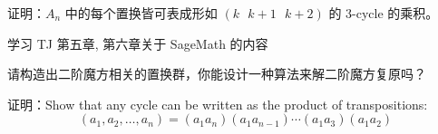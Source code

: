 \documentclass[a4paper, justified]{tufte-handout}
\begin{document}
\beginoptional

\begin{problem}[$Z_p$]
证明：$A_n$ 中的每个置换皆可表成形如 $(k \text{ } k+1 \text{ } k+2)$ 的 3-cycle 的乘积。
\end{problem}

\begin{solution}
\end{solution}

\begin{problem}[SageMath学习]
学习 TJ 第五章, 第六章关于 SageMath 的内容
\end{problem}

\begin{solution}
\end{solution}

\beginot
\begin{ot}[二阶魔方]	
	请构造出二阶魔方相关的置换群，你能设计一种算法来解二阶魔方复原吗？
\end{ot}


\begin{ot}[transpositions]	
	证明：Show that any cycle can be written as the product of transpositions:
	$$(a_1,a_2,…,a_n)=(a_1 a_n)(a_1 a_{n−1} )⋯(a_1 a_3)(a_1 a_2)$$
	
\end{ot}




% 




\beginfb

% 
% 
\end{document}

